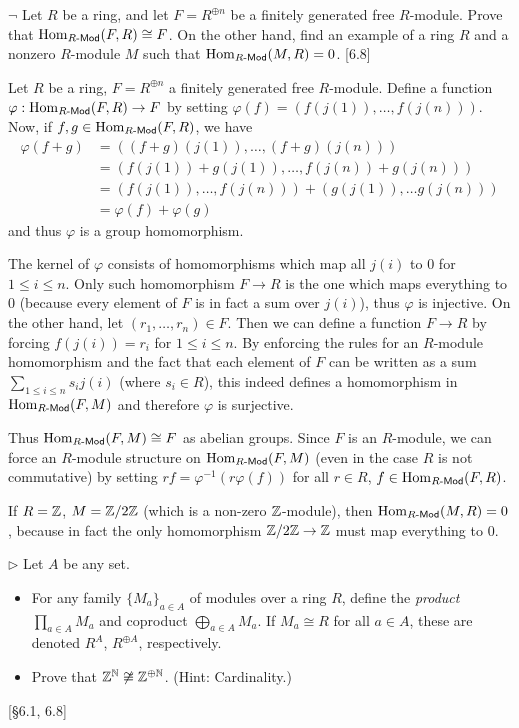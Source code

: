 \begin{problem}
	$\neg$ Let $R$ be a ring, and let $F = R^{\oplus n}$ be a finitely generated free $R$-module. Prove that $\mathrm{Hom}_{R\text{-}\mathsf{Mod}}(F, R) \cong F$. On the other hand, find an example of a ring $R$ and a nonzero $R$-module $M$ such that $\mathrm{Hom}_{R\text{-}\mathsf{Mod}}(M, R) = 0$. [6.8]
\end{problem}

\begin{solution}
	Let $R$ be a ring, $F = R^{\oplus n}$ a finitely generated free $R$-module. Define a function $\varphi: \mathrm{Hom}_{R\text{-}\mathsf{Mod}}(F, R) \to F$ by setting $\varphi(f) = (f(j(1)), \dots, f(j(n)))$. Now, if $f, g \in \mathrm{Hom}_{R\text{-}\mathsf{Mod}}(F, R)$, we have
	\begin{align*}
		\varphi(f + g) &= ((f+g)(j(1)), \dots, (f+g)(j(n))) \\
		&= (f(j(1)) + g(j(1)), \dots, f(j(n)) + g(j(n))) \\
		&= (f(j(1)), \dots, f(j(n))) + (g(j(1)), \dots g(j(n))) \\
		&= \varphi(f) + \varphi(g)
	\end{align*}
	and thus $\varphi$ is a group homomorphism.
	
	The kernel of $\varphi$ consists of homomorphisms which map all $j(i)$ to $0$ for $1 \leq i \leq n$. Only such homomorphism $F \to R$ is the one which maps everything to $0$ (because every element of $F$ is in fact a sum over $j(i)$), thus $\varphi$ is injective. On the other hand, let $(r_1, \dots, r_n) \in F$. Then we can define a function $F \to R$ by forcing $f(j(i)) = r_i$ for $1 \leq i \leq n$. By enforcing the rules for an $R$-module homomorphism and the fact that each element of $F$ can be written as a sum $\sum_{1 \leq i \leq n} s_i j(i)$ (where $s_i \in R$), this indeed defines a homomorphism in $\mathrm{Hom}_{R\text{-}\mathsf{Mod}}(F, M)$ and therefore $\varphi$ is surjective.
	
	Thus $\mathrm{Hom}_{R\text{-}\mathsf{Mod}}(F, M) \cong F$ as abelian groups. Since $F$ is an $R$-module, we can force an $R$-module structure on $\mathrm{Hom}_{R\text{-}\mathsf{Mod}}(F, M)$ (even in the case $R$ is not commutative) by setting $rf = \varphi^{-1}(r \varphi(f))$ for all $r \in R$, $f \in \mathrm{Hom}_{R\text{-}\mathsf{Mod}}(F, R)$.
	
	If $R = \mathbb{Z}$, $M = \mathbb{Z}/2\mathbb{Z}$ (which is a non-zero $\mathbb{Z}$-module), then $\mathrm{Hom}_{R\text{-}\mathsf{Mod}}(M, R) = 0$, because in fact the only homomorphism $\mathbb{Z}/2\mathbb{Z} \to \mathbb{Z}$ must map everything to $0$.
\end{solution}

\begin{problem}
	$\triangleright$ Let $A$ be any set.
	\begin{itemize}
		\item For any family $\{ M_a \}_{a \in A}$ of modules over a ring $R$, define the \emph{product} $\prod_{a \in A}M_a$ and coproduct $\bigoplus_{a \in A}M_a$. If $M_a \cong R$ for all $a \in A$, these are denoted $R^A$, $R^{\oplus A}$, respectively.
		\item Prove that $\mathbb{Z}^{\mathbb{N}} \not \cong \mathbb{Z}^{\oplus \mathbb{N}}$. (Hint: Cardinality.)
	\end{itemize}
	[\S 6.1, 6.8]
\end{problem}

